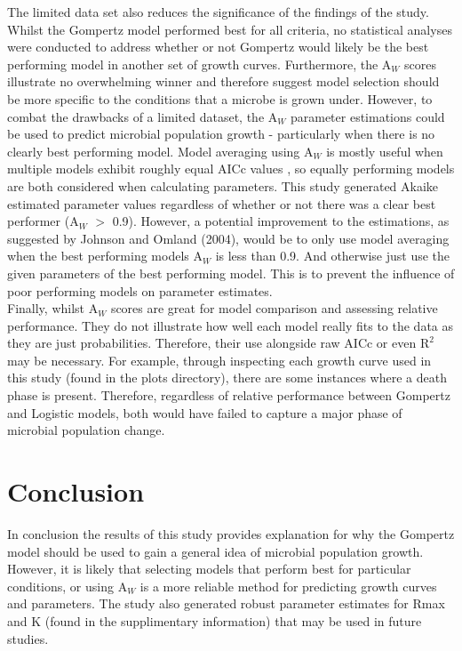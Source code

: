 \documentclass[12pt]{article}
\begin{document}
The limited data set also reduces the significance of the findings of the study. Whilst the Gompertz model performed best for all criteria, no statistical analyses were conducted to address whether or not Gompertz would likely be the best performing model in another set of growth curves. Furthermore, the $\mathrm{A}_{\textit{W}}$ scores illustrate no overwhelming winner and therefore suggest model selection should be more specific to the conditions that a microbe is grown under. However, to combat the drawbacks of a limited dataset, the $\mathrm{A}_{\textit{W}}$ parameter estimations could be used to predict microbial population growth - particularly when there is no clearly best performing model. Model averaging using $\mathrm{A}_{\textit{W}}$ is mostly useful when multiple models exhibit roughly equal AICc values \cite{JOHNSON2004101}, so equally performing models are both considered when calculating parameters. This study generated Akaike estimated parameter values regardless of whether or not there was a clear best performer ($\mathrm{A}_{\textit{W}}$ $>$ 0.9). However, a potential improvement to the estimations, as suggested by Johnson and Omland (2004), would be to only use model averaging when the best performing models $\mathrm{A}_{\textit{W}}$ is less than 0.9. And otherwise just use the given parameters of the best performing model. This is to prevent the influence of poor performing models on parameter estimates.\\

Finally, whilst $\mathrm{A}_{\textit{W}}$ scores are great for model comparison and assessing relative performance. They do not illustrate how well each model really fits to the data as they are just probabilities. Therefore, their use alongside raw AICc or even $\mathrm{R}^2$ may be necessary. For example, through inspecting each growth curve used in this study (found in the plots directory), there are some instances where a death phase is present. Therefore, regardless of relative performance between Gompertz and Logistic models, both would have failed to capture a major phase of microbial population change.

\section{Conclusion}
In conclusion the results of this study provides explanation for why the Gompertz model should be used to gain a general idea of microbial population growth. However, it is likely that selecting models that perform best for particular conditions, or using $\mathrm{A}_{\textit{W}}$ is a more reliable method for predicting growth curves and parameters. The study also generated robust parameter estimates for Rmax and K (found in the supplimentary information) that may be used in future studies.

  
  
  

  
\end{document}
